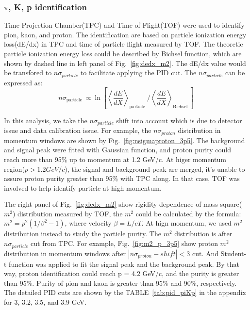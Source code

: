 \subsubsection{$\pi$, K, p identification}

Time Projection Chamber(TPC)\cite{ANDERSON2003659} and Time of Flight(TOF)\cite{LLOPE2012S110} were used to identify pion, kaon, and proton. 
The identification are based on particle ionization energy loss(dE/dx) in TPC and time of particle flight measured by TOF.
The theoretic particle ionization energy loss could be described by Bichsel function, which are shown by dashed line in left panel of Fig.~\ref{fig:dedx_m2}.
The dE/dx value would be transfored to $n\sigma_{particle}$ to facilitate applying the PID cut. The $n\sigma_{particle}$ can be expressed as:
\begin{equation}
n \sigma_{\text {particle }} \propto \ln \left[\left\langle\frac{d E}{d X}\right\rangle_{\text {particle }} /\left\langle\frac{d E}{d X}\right\rangle_{\text {Bichsel }}\right]
\label{eq:nsigma}
\end{equation}

In this analysis, we take the $n\sigma_{particle}$ shift into account which is due to detector issue and data calibration issue.
For example, the $n\sigma_{proton}$ distribution in momentum windows are shown by Fig.~\ref{fig:nsigmaproton_3p5}.
The background and signal peak were fitted with Gaussian function, and proton purity could reach more than 95\% up to momentum at 1.2 GeV/c.
At higer momentum region($p > 1.2 GeV/c$), the signal and background peak are merged, it's unable to assure proton purity greater than 95\% with TPC along.
In that case, TOF was involved to help identify particle at high momentum.

The right panel of Fig.~\ref{fig:dedx_m2} show rigidity dependence of mass square($m^2$) distribution measured by TOF, the $m^2$ could be calculated by the formula: 
$m^2 = p^2(1/\beta^2 - 1)$, where velocity $\beta = L/cT$. At hign momentum, we used $m^2$ distribution instead to study the particle purity. 
The $m^2$ distribution is after $n\sigma_{particle}$ cut from TPC. For example, Fig.~\ref{fig:m2_p_3p5} show proton $m^2$ distribution in momentum windows
after $|n\sigma_{proton} -shift| < 3$ cut. And Student-t function was applied to fit the signal peak and the background peak.
By that way, proton identification could reach p = 4.2 GeV/c, and the purity is greater than 95\%. Purity of pion and kaon is greater than 95\% and 90\%, respectively.  
The detailed PID cuts are shown by the TABLE~\ref{tab:pid_piKp} in the appendix for 3, 3.2, 3.5, and 3.9 GeV.

